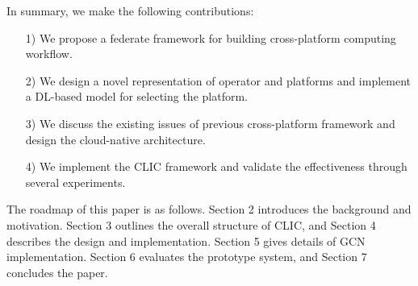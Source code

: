 In summary, we make the following contributions:
\begin{itemize}
\item [1)]
We propose a federate framework for building cross-platform computing workflow.
\item [2)]
We design a novel representation of operator and platforms and implement a DL-based model for selecting the platform.
\item [3)]
We discuss the existing issues of previous cross-platform framework and design the cloud-native architecture.
\item [4)]
We implement the CLIC framework and validate the effectiveness through several experiments.
\end{itemize}

The roadmap of this paper is as follows. Section 2 introduces the background and motivation. Section 3 outlines the overall structure of CLIC, and Section 4 describes the design and implementation. Section 5 gives details of GCN implementation. Section 6 evaluates the prototype system, and Section 7 concludes the paper.

